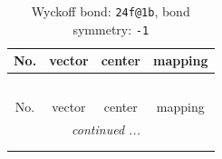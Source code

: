 \documentclass[fleqn,8pt]{jsarticle}
\begin{document}
\renewcommand{\arraystretch}{1.2}
\begin{longtable}{cccc}
\caption{Wyckoff bond: {\tt 24f@1b}, bond symmetry: {\tt -1}}
 \\
 \hline \hline
No. & vector & center & mapping \\ \hline \endfirsthead

\multicolumn{3}{l}{\tablename\ \thetable{}} \\
 \hline \hline
No. & vector & center & mapping \\ \hline \endhead

 \hline \hline
\multicolumn{3}{r}{\footnotesize\it continued ...} \\ \endfoot

 \hline \hline
\multicolumn{3}{r}{} \\ \endlastfoot


\end{longtable}
\end{document}
